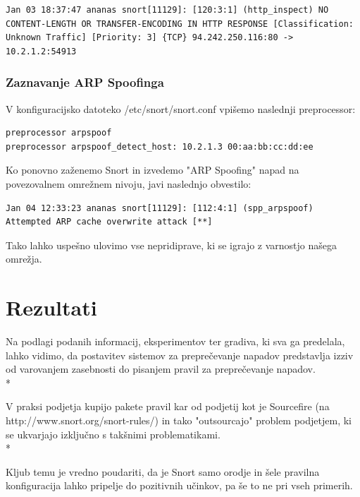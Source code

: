 \documentclass[12pt]{article}
\let\stdsection\section
\renewcommand\section{\newpage\stdsection}
\begin{document}
\begin{verbatim}
Jan 03 18:37:47 ananas snort[11129]: [120:3:1] (http_inspect) NO CONTENT-LENGTH OR TRANSFER-ENCODING IN HTTP RESPONSE [Classification: Unknown Traffic] [Priority: 3] {TCP} 94.242.250.116:80 -> 10.2.1.2:54913
\end{verbatim}


\subsubsection{Zaznavanje ARP Spoofinga} %

V konfiguracijsko datoteko /etc/snort/snort.conf vpišemo naslednji preprocessor:

\begin{verbatim}
preprocessor arpspoof
preprocessor arpspoof_detect_host: 10.2.1.3 00:aa:bb:cc:dd:ee
\end{verbatim}

Ko ponovno zaženemo Snort in izvedemo "ARP Spoofing" napad na povezovalnem omrežnem nivoju, javi naslednjo obvestilo:

\begin{verbatim}
Jan 04 12:33:23 ananas snort[11129]: [112:4:1] (spp_arpspoof) Attempted ARP cache overwrite attack [**]
\end{verbatim}

Tako lahko uspešno ulovimo vse nepridiprave, ki se igrajo z varnostjo našega omrežja.



\section{Rezultati}

Na podlagi podanih informacij, eksperimentov ter gradiva, ki sva ga predelala, lahko vidimo, da postavitev
sistemov za preprečevanje napadov predstavlja izziv od varovanjem zasebnosti do pisanjem pravil za preprečevanje napadov.
\\*

V praksi podjetja kupijo pakete pravil kar od podjetij kot je Sourcefire (na http://www.snort.org/snort-rules/)
in tako "outsourcajo" problem podjetjem, ki se ukvarjajo izključno s takšnimi problematikami. 
\\*

Kljub temu je vredno poudariti, da je Snort samo orodje in šele pravilna konfiguracija lahko pripelje do pozitivnih
učinkov, pa še to ne pri vseh primerih.
\end{document}
